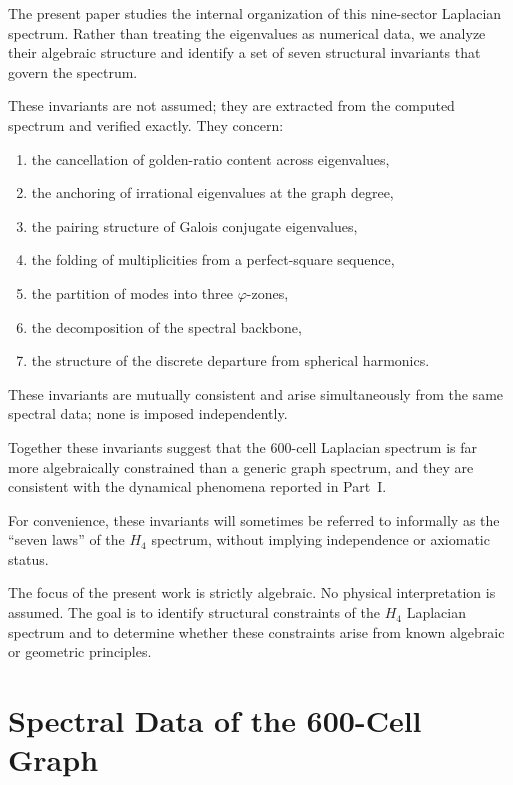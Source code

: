 \documentclass[12pt,a4paper]{article}
\newcommand{\Hfour}{H_4}
\newcommand{\vphi}{\varphi}
\begin{document}
The present paper studies the internal organization of this
nine-sector Laplacian spectrum.  Rather than treating the eigenvalues
as numerical data, we analyze their algebraic structure and identify a
set of seven structural invariants that govern the spectrum.

These invariants are not assumed; they are extracted from the computed
spectrum and verified exactly.  They concern:
\begin{enumerate}[nosep]
\item the cancellation of golden-ratio content across eigenvalues,
\item the anchoring of irrational eigenvalues at the graph degree,
\item the pairing structure of Galois conjugate eigenvalues,
\item the folding of multiplicities from a perfect-square sequence,
\item the partition of modes into three $\vphi$-zones,
\item the decomposition of the spectral backbone,
\item the structure of the discrete departure from spherical harmonics.
\end{enumerate}

These invariants are mutually consistent and arise simultaneously from
the same spectral data; none is imposed independently.

Together these invariants suggest that the 600-cell Laplacian
spectrum is far more algebraically constrained than a generic
graph spectrum, and they are consistent with the dynamical phenomena
reported in Part~I.

For convenience, these invariants will sometimes be referred to
informally as the ``seven laws'' of the $\Hfour$ spectrum, without
implying independence or axiomatic status.

The focus of the present work is strictly algebraic.  No physical
interpretation is assumed.  The goal is to identify structural
constraints of the $\Hfour$ Laplacian spectrum and to determine whether
these constraints arise from known algebraic or geometric principles.


\section{Spectral Data of the 600-Cell Graph}\label{sec:data}
\end{document}
